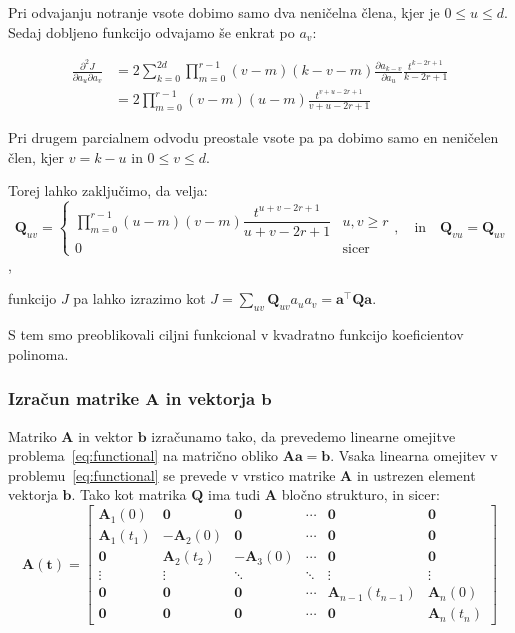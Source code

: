 \documentclass[mat2, tisk]{fmfdelo}
\newcommand{\qmat}{\mathbf{Q}}
\newcommand{\amat}{\mathbf{A}}
\newcommand{\bvec}{\mathbf{b}}
\newcommand{\avec}{\mathbf{a}}
\newcommand{\tvec}{\mathbf{t}}
\begin{document}
Pri odvajanju notranje vsote dobimo samo dva neničelna člena, kjer je $0 \leq u \leq d$. Sedaj dobljeno funkcijo odvajamo še enkrat po $a_v$:

\begin{equation}
\begin{aligned}
    \frac{\partial^2 J}{\partial a_u \partial a_v} &= 2\sum_{k=0}^{2d} \prod_{m=0}^{r-1} (v-m)(k-v-m) \frac{\partial a_{k-v}}{\partial a_u} \frac{t^{k-2r+1}}{k-2r+1}\\
    &= 2\prod_{m=0}^{r-1} (v-m)(u-m) \frac{t^{v+u-2r+1}}{v+u-2r+1}
\end{aligned}
\end{equation}

Pri drugem parcialnem odvodu preostale vsote pa pa dobimo samo en neničelen člen, kjer $v = k-u$ in $0 \leq v \leq d$.

Torej lahko zaključimo, da velja:
\begin{equation}
    \qmat_{uv} = \begin{cases}
        \prod_{m=0}^{r-1} (u - m)(v - m) \dfrac{t^{u+v-2r+1}}{u + v - 2r + 1} & u, v \geq r\\
        0 & \text{sicer}
    \end{cases}, \quad \text{in} \quad \qmat_{vu} = \qmat_{uv}
\end{equation},

funkcijo $J$ pa lahko izrazimo kot $J = \sum_{uv} \qmat_{uv} a_u a_v = \avec^\top \qmat \avec$.

S tem smo preoblikovali ciljni funkcional v kvadratno funkcijo koeficientov polinoma.

\subsubsection{Izračun matrike $\amat$ in vektorja $\bvec$}

Matriko $\amat$ in vektor $\bvec$ izračunamo tako, da prevedemo linearne omejitve problema~\eqref{eq:functional} na matrično obliko $\amat \avec = \bvec$. Vsaka linearna omejitev v problemu~\eqref{eq:functional} se prevede v vrstico matrike $\amat$ in ustrezen element vektorja $\bvec$. Tako kot matrika $\qmat$ ima tudi $\amat$ bločno strukturo, in sicer:
\begin{equation}
    \amat(\tvec) = 
    \begin{bmatrix}
    \amat_1(0) & \mathbf{0} & \mathbf{0} & \cdots & \mathbf{0} & \mathbf{0} \\
    \amat_1(t_1) & -\amat_2(0) & \mathbf{0} & \cdots & \mathbf{0} & \mathbf{0} \\
    \mathbf{0} & \amat_2(t_2) & - \amat_3(0) & \cdots & \mathbf{0} & \mathbf{0} \\
    \vdots & \vdots & \ddots & \ddots & \vdots & \vdots \\
    \mathbf{0} & \mathbf{0} & \mathbf{0} &\cdots & \amat_{n-1}(t_{n-1}) & \amat_n(0) \\
    \mathbf{0} & \mathbf{0} & \mathbf{0} &\cdots & \mathbf{0} & \amat_n(t_n)
    \end{bmatrix}
\end{equation}
\end{document}

